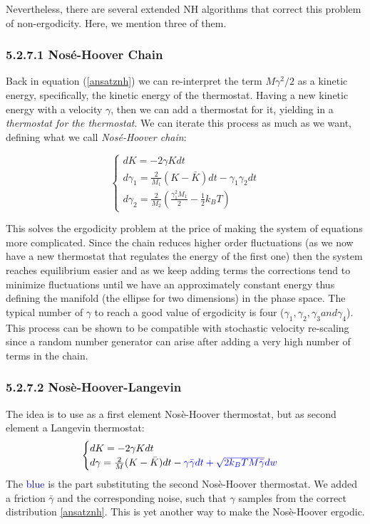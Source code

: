\par Nevertheless, there are several extended NH algorithms that correct this problem of non-ergodicity. Here, we mention three of them.

\subsubsection{5.2.7.1 Nosé-Hoover Chain}
Back in equation (\ref{ansatznh}) we can re-interpret the term $M \gamma^2/2$ as a kinetic energy, specifically, the kinetic energy of the thermostat. Having a new kinetic energy with a velocity $\gamma$, then we can add a thermostat for it, yielding in a \textit{thermostat for the thermostat}. We can iterate this process as much as we want, defining what we call \textit{Nosé-Hoover chain}:

\begin{equation}
    \begin{cases}
    dK = -2\gamma Kdt\\
    d\gamma_1 = \frac{2}{M_1}(K -\bar{K})dt - \gamma_1 \gamma_2 dt\\
    d\gamma_2 = \frac{2}{M_2}\left(\frac{\gamma_1 ^2 M_1}{2} - \frac{1}{2}k_B T\right)
    \end{cases}
\end{equation}

This solves the ergodicity problem at the price of making the system of equations more complicated. Since the chain reduces higher order fluctuations (as we now have a new thermostat that regulates the energy of the first one) then the system reaches equilibrium easier and as we keep adding terms the corrections tend to minimize fluctuations until we have an approximately constant energy thus defining the manifold (the ellipse for two dimensions) in the phase space. The typical number of $\gamma$ to reach a good value of ergodicity is four ($\gamma_1, \gamma_2, \gamma_3 and \gamma_4$).  
This process can be shown to be compatible with stochastic velocity re-scaling since a random number generator can arise after adding a very high number of terms in the chain.

\subsubsection{5.2.7.2 Nosè-Hoover-Langevin}
The idea is to use as a first element Nosè-Hoover thermostat, but as second element a Langevin thermostat:
\begin{equation*}
    \begin{cases}
    dK = -2\gamma Kdt\\
    d\gamma = \frac{2}{M}(K-\bar{K})dt - \color{blue}{\gamma \bar{\gamma}dt + \sqrt{2k_B TM\bar{\gamma}}d w}
    \end{cases}
\end{equation*} 
The \textcolor{blue}{blue} is the part substituting the second Nosè-Hoover thermostat. We added a friction $\bar{\gamma}$ and the corresponding noise, such that $\gamma$ samples from the correct distribution \ref{ansatznh}. This is yet another way to make the Nosè-Hoover ergodic.


